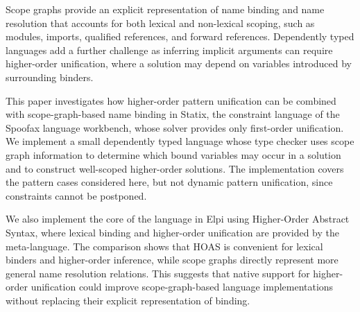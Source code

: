 Scope graphs provide an explicit representation of name binding and name
resolution that accounts for both lexical and non-lexical scoping, such as
modules, imports, qualified references, and forward references. Dependently
typed languages add a further challenge as inferring implicit arguments can
require higher-order unification, where a solution may depend on variables
introduced by surrounding binders.

This paper investigates how higher-order pattern unification can be combined
with scope-graph-based name binding in Statix, the constraint language of the
Spoofax language workbench, whose solver provides only first-order
unification. We implement a small dependently typed language whose type
checker uses scope graph information to determine which bound variables may
occur in a solution and to construct well-scoped higher-order solutions. The
implementation covers the pattern cases considered here, but not dynamic
pattern unification, since constraints cannot be postponed.

We also implement the core of the language in Elpi using Higher-Order Abstract
Syntax, where lexical binding and higher-order unification are provided by the
meta-language. The comparison shows that HOAS is convenient for lexical binders
and higher-order inference, while scope graphs directly represent more general
name resolution relations. This suggests that native support for higher-order
unification could improve scope-graph-based language implementations without
replacing their explicit representation of binding.
